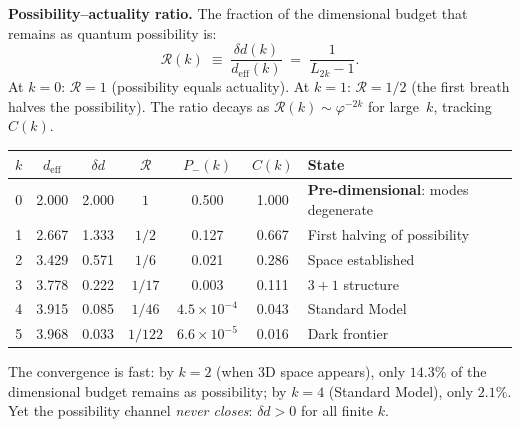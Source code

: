 \documentclass[12pt,a4paper]{article}
\begin{document}
\noindent\textbf{Possibility--actuality ratio.}  The fraction of the dimensional budget that remains as quantum possibility is:
\begin{equation}
\mathcal{R}(k) \;\equiv\; \frac{\delta d(k)}{d_{\mathrm{eff}}(k)} \;=\; \frac{1}{L_{2k} - 1}.
\label{eq:poss-act-ratio}
\end{equation}
At $k = 0$: $\mathcal{R} = 1$ (possibility equals actuality).  At $k = 1$: $\mathcal{R} = 1/2$ (the first breath halves the possibility).  The ratio decays as $\mathcal{R}(k) \sim \varphi^{-2k}$ for large~$k$, tracking $C(k)$.

\begin{center}
\begin{tabular}{|c|c|c|c|c|c|l|}
\hline
$k$ & $d_{\mathrm{eff}}$ & $\delta d$ & $\mathcal{R}$ & $P_-(k)$ & $C(k)$ & State \\
\hline
0 & 2.000 & 2.000 & $1$ & 0.500 & 1.000 & \textbf{Pre-dimensional}: modes degenerate \\
1 & 2.667 & 1.333 & $1/2$ & 0.127 & 0.667 & First halving of possibility \\
2 & 3.429 & 0.571 & $1/6$ & 0.021 & 0.286 & Space established \\
3 & 3.778 & 0.222 & $1/17$ & 0.003 & 0.111 & $3{+}1$ structure \\
4 & 3.915 & 0.085 & $1/46$ & $4.5 \times 10^{-4}$ & 0.043 & Standard Model \\
5 & 3.968 & 0.033 & $1/122$ & $6.6 \times 10^{-5}$ & 0.016 & Dark frontier \\
\hline
\end{tabular}
\end{center}

\noindent The convergence is fast: by $k = 2$ (when 3D space appears), only $14.3\%$ of the dimensional budget remains as possibility; by $k = 4$ (Standard Model), only $2.1\%$.  Yet the possibility channel \emph{never closes}: $\delta d > 0$ for all finite $k$.
\end{document}
